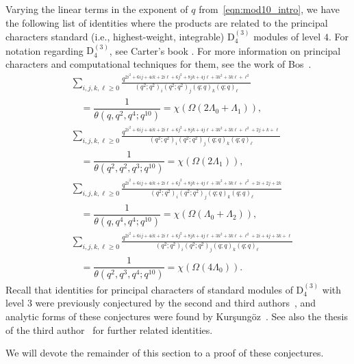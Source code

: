 \documentclass[ALCO,Unicode,published]{cedram}
\begin{document}
Varying the linear terms in the exponent of $q$ from~\eqref{eqn:mod10_intro}, we have the following list of identities where the products are related to the
principal characters standard (i.e., highest-weight, integrable) $\mathrm{D}_4^{(3)}$ modules of level $4$.
For notation regarding $\mathrm{D}_4^{(3)}$, see Carter's book \cite[P.\ 608]{Car-book}. 
For more information on principal characters and computational techniques for them, see the work of Bos~\cite{Bos}.
\begin{align}
&\sum_{i,j,k,\ell \ge 0}
\frac{q^{2i^2 + 6 ij + 4ik + 2i\ell + 6j^2 + 8 jk + 4 j\ell + 3k^2+3k\ell+\ell^2}}
{\left(q^2;q^2\right)_i\left(q^2;q^2\right)_j\left(q;q\right)_k\left(q;q\right)_\ell}\nonumber\\
&\quad=
\dfrac{1}{\theta(q,q^2,q^4;q^{10})} 
=\chi(\Omega(2\Lambda_0+\Lambda_1)),
\label{eq:mod10A}
\\
&\sum_{i,j,k,\ell \ge 0}
\frac{q^{2i^2 + 6 ij + 4ik + 2i\ell + 6j^2 + 8 jk + 4 j\ell + 3k^2+3k\ell+\ell^2+2j+k+\ell}}
{\left(q^2;q^2\right)_i\left(q^2;q^2\right)_j\left(q;q\right)_k\left(q;q\right)_\ell}
\nonumber\\ 
&\quad=
\dfrac{1}{\theta(q^2,q^2,q^3;q^{10})}  
=\chi(\Omega(2\Lambda_1)),
\\
&\sum_{i,j,k,\ell \ge 0}
\frac{q^{2i^2 + 6 ij + 4ik + 2i\ell + 6j^2 + 8 jk + 4 j\ell + 3k^2+3k\ell+\ell^2+2i+2j+2k}}
{\left(q^2;q^2\right)_i\left(q^2;q^2\right)_j\left(q;q\right)_k\left(q;q\right)_\ell}
\nonumber\\ 
&\quad= 
\dfrac{1}{\theta(q,q^4,q^4;q^{10})}  
=\chi(\Omega(\Lambda_0+\Lambda_2)),
\\
&\sum_{i,j,k,\ell \ge 0}
\frac{q^{2i^2 + 6 ij + 4ik + 2i\ell + 6j^2 + 8 jk + 4 j\ell + 3k^2+3k\ell+\ell^2+2i+4j+3k+\ell}}
{\left(q^2;q^2\right)_i\left(q^2;q^2\right)_j\left(q;q\right)_k\left(q;q\right)_\ell}
\nonumber\\ 
&\quad=
\dfrac{1}{\theta(q^2,q^3,q^4;q^{10})}   
= \chi(\Omega(4\Lambda_0)). \label{eq:mod10D}
\end{align}
Recall that  identities for principal characters of  standard modules
of $\mathrm{D}_4^{(3)}$ with level $3$ were previously conjectured by the second and third authors~\cite{KanRus-idf}, and
analytic forms of these conjectures were found by Kur\c{s}ung\"{o}z~\cite{Kur-KR}. See also the thesis of the third author~\cite{Rus-thesis} for further
related identities.

We will devote the remainder of this section to a proof of these conjectures.
\end{document}
